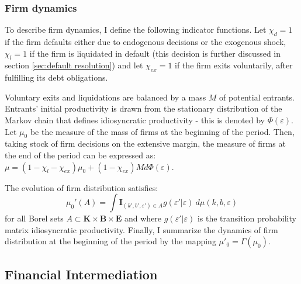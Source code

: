 \documentclass[12pt]{article}
\begin{document}
\subsubsection{Firm dynamics}
To describe firm dynamics, I define the following indicator functions. Let $\chi_{d} = 1$ if the firm defaults either due to endogenous decisions or the exogenous shock, $\chi_l = 1$ if the firm is liquidated in default (this decision is further discussed in section \ref{sec:default resolution}) and let $\chi_{ex} = 1$ if the firm exits voluntarily, after fulfilling its debt obligations. 

Voluntary exits and liquidations are balanced by a mass $M$ of potential entrants. Entrants' initial productivity is drawn from the stationary distribution of the Markov chain that defines idiosyncratic productivity - this is denoted by $\Phi(\varepsilon)$. Let $\mu_0$ be the measure of the mass of firms at the beginning of the period. Then, taking stock of firm decisions on the extensive margin, the measure of firms at the end of the period can be expressed as: $\mu = (1 - \chi_l - \chi_{ex}) \mu_0 + (1 - \chi_{ex}) M d \Phi(\varepsilon) $. 

The evolution of firm distribution satisfies: 
\begin{equation} \label{eq_firmdim} 
	\mu_{0}'(A) = \int \mathbf{I}_{(k', b', \varepsilon') \in A} g(\varepsilon'|\varepsilon) \ d \mu (k,b,\varepsilon)
\end{equation}
for all Borel sets $A \subset \mathbf{K} \times \mathbf{B} \times \mathbf{E} $ and where $g(\varepsilon'|\varepsilon)$ is the transition probability matrix idiosyncratic productivity. Finally, I summarize the dynamics of firm distribution at the beginning of the period by the mapping $ \mu'_0 =\Gamma(\mu_0)$.


\subsection{Financial Intermediation}  \label{sec: Financial Intermediation}
\end{document}

